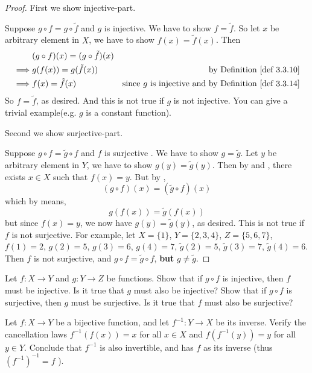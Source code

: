 \begin{proof}
First we show injective-part.

Suppose \(g \circ f = g \circ \tilde{f}\) and \(g\) is injective. We have to show \(f = \tilde{f}\).
So let \(x\) be arbitrary element in \(X\), we have to show \(f(x) = \tilde{f}(x)\).
Then
\begin{align*}
         & (g \circ f)(x) = (g \circ \tilde{f})(x) \\
    \implies & g(f(x)) = g(\tilde{f}(x)) & \text{by \DEF{3.3.10}} \\
    \implies & f(x) = \tilde{f}(x)       & \text {since \(g\) is injective and by \DEF{3.3.14}}
\end{align*}
So \(f = \tilde{f}\), as desired.
And this is not true if \(g\) is not injective.
You can give a trivial example(e.g. \(g\) is a constant function).

Second we show surjective-part.

Suppose \(g \circ f = \tilde{g} \circ f\)  and \(f\) is surjective .
We have to show \(g = \tilde{g}\).
Let \(y\) be arbitrary element in \(Y\), we have to show \(g(y) = \tilde{g}(y)\).
Then by  and , there exists \(x \in X\) such that \(f(x) = y\).
But by ,
\[
    (g \circ f)(x) = (\tilde{g} \circ f)(x)
\]
which by  means,
\[
    g(f(x)) = \tilde{g}(f(x))
\]
but since \(f(x) = y\), we now have \(g(y) = \tilde{g}(y)\), as desired.
This is not true if \(f\) is not surjective.
For example,
let \(X = \{1\}\), \(Y = \{2, 3, 4\}\), \(Z = \{5, 6, 7\}\), 
\(f(1) = 2\),
\(g(2) = 5\), \(g(3) = 6\), \(g(4) = 7\),
\(\tilde{g}(2) = 5\), \(\tilde{g}(3) = 7\), \(\tilde{g}(4) = 6\).
Then \(f\) is not surjective, and \(g \circ f = \tilde{g} \circ f\), \textbf{but} \(g \neq \tilde{g}\).
\end{proof}

\begin{exercise} \label{exercise 3.3.5}
Let \(f : X \rightarrow Y\) and \(g : Y \rightarrow Z\) be functions.
Show that if \(g \circ f\) is injective, then \(f\) must be injective.
Is it true that \(g\) must also be injective?
Show that if \(g \circ f\) is surjective, then \(g\) must be surjective.
Is it true that \(f\) must also be surjective?
\end{exercise}

\begin{exercise} \label{exercise 3.3.6}
Let \(f : X \rightarrow Y\) be a bijective function, and let \(f^{-1} : Y \rightarrow X\) be its inverse.
Verify the cancellation laws \(f^{-1}(f(x)) = x\) for all \(x \in X\) and \(f(f^{-1}(y)) = y\) for all \(y \in Y\).
Conclude that \(f^{-1}\) is also invertible, and has \(f\) as its inverse (thus \( (f^{-1})^{-1} = f \) ).
\end{exercise}

